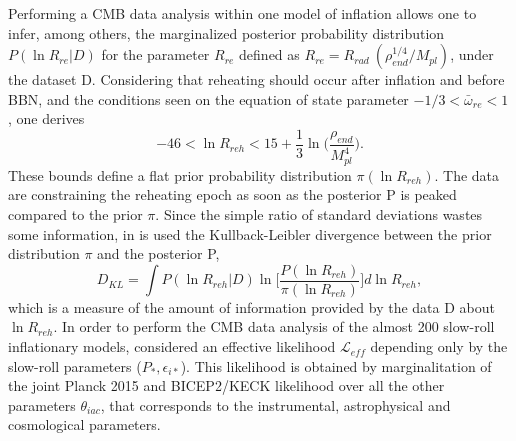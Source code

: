 \documentclass[11pt,a4paper,twoside]{book}
\begin{document}
 Performing a CMB data analysis within one model of inflation allows one to infer, among others, the marginalized posterior probability distribution $ P(\ln R_{re}|D
) $ for the parameter $ R_{re} $ defined as $R_{re}=R_{rad}\ (\rho_{end}^{1/4}/M_{pl})  $, under the dataset D.  Considering that reheating should occur after inflation and before BBN, and the conditions seen on the equation of state parameter $ -1/3 < \bar{\omega}_{re} < 1 $, one derives
\begin{equation}
	\label{Chap3:PriorChoiche}
	-46 < \ln R_{reh} < 15 + \frac{1}{3}\ln\Bigg( \frac{\rho_{end}}{M_{pl}^{4}}\Bigg).
\end{equation}
These bounds define a flat prior probability distribution $ \pi(\ln R_{reh}) $. The data are constraining the reheating epoch as soon as the posterior P is peaked compared to the prior $\pi$. Since the simple ratio of standard deviations wastes some information, in \cite{Chap3:Martin_Milestone}  is used the Kullback-Leibler divergence between the prior distribution $\pi$ and the posterior P,
\begin{equation}
\label{Chap3:KullbackLeiblerDivergence}
D_{KL}=\int P(\ln R_{reh}|D)\ln \Bigg[\frac{P(\ln R_{reh})}{\pi(\ln R_{reh})}\Bigg]d \ln R_{reh},
\end{equation}
which is a measure of the amount of information provided by the data D about $ \ln R_{reh} $.
In order to perform the CMB data analysis of the almost 200 slow-roll inflationary models, \cite{Chap3:Martin_Milestone} considered an effective likelihood $\mathcal{L}_{eff}$ depending  only by the slow-roll parameters ($ P_{*},\epsilon_{i*} $). This likelihood is obtained by marginalitation of the joint Planck 2015 and BICEP2/KECK likelihood over all the other parameters $ \theta_{iac} $, that corresponds to the instrumental, astrophysical and cosmological parameters.
\end{document}
